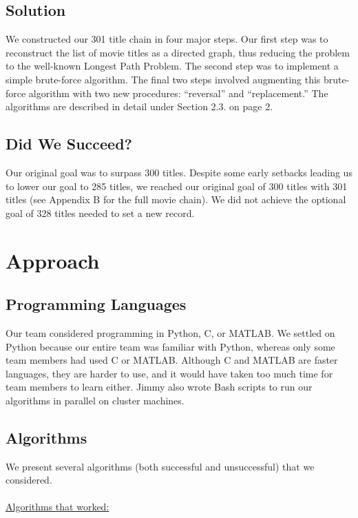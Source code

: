 \documentclass[11pt,english]{article}
\begin{document}
\subsection{Solution}
We constructed our 301 title chain in four major steps. Our first step was to
reconstruct the list of movie titles as a directed graph, thus reducing the
problem to the well-known Longest Path Problem. The second step was to
implement a simple brute-force algorithm. The final two steps involved
augmenting this brute-force algorithm with two new procedures: ``reversal'' and
``replacement.'' The algorithms are described in detail under Section 2.3. on
page 2.

\subsection{Did We Succeed?}
Our original goal was to surpass 300 titles. Despite some early setbacks
leading us to lower our goal to 285 titles, we reached our original goal of 300
titles with 301 titles (see Appendix B for the full movie chain). We did not
achieve the optional goal of 328 titles needed to set a new record.

\section{Approach}

%
\subsection{Programming Languages}
Our team considered programming in Python, C, or MATLAB. We
settled on Python because our entire team was familiar with Python, whereas
only some team members had used C or MATLAB. Although C and MATLAB are faster
languages, they are harder to use, and it would have taken too much time for
team members to learn either. Jimmy also wrote Bash scripts to run our
algorithms in parallel on cluster machines.

\subsection{Algorithms}
We present several algorithms (both successful and unsuccessful) that we
considered.\\\\
\underline{Algorithms that worked:}
\end{document}
